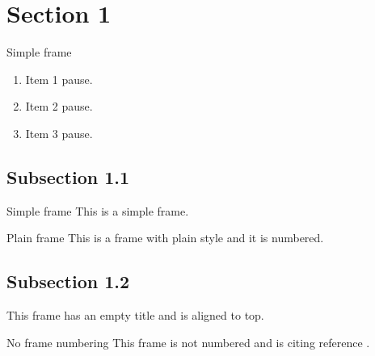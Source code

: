 
    \section{Section 1}
    \begin{frame}{Simple frame}
        \begin{enumerate}
            \item Item 1 pause.
            \pause
            \item Item 2 pause.
            \pause
            \item Item 3 pause.
        \end{enumerate}
    \end{frame}
    \begin{frame}

    \end{frame}
    \subsection{Subsection 1.1}

    \begin{frame}{Simple frame}
        This is a simple frame.
    \end{frame}
    
    \begin{frame}{Plain frame}
        This is a frame with plain style and it is numbered.
    \end{frame}
    \subsection{Subsection 1.2}
    \begin{frame}
        This frame has an empty title and is aligned to top.
    \end{frame}
    
    \begin{frame}{No frame numbering}
        This frame is not numbered and is citing reference \cite{knuth74}.
    \end{frame}
    
